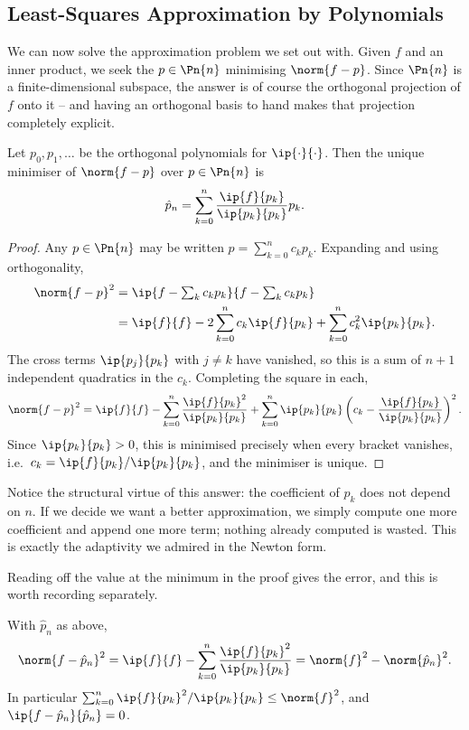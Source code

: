\subsection{Least-Squares Approximation by Polynomials}

We can now solve the approximation problem we set out with. Given $f$ and an inner product, we seek the $p \in \Pn{n}$ minimising $\norm{f - p}$. Since $\Pn{n}$ is a finite-dimensional subspace, the answer is of course the orthogonal projection of $f$ onto it -- and having an orthogonal basis to hand makes that projection completely explicit.

\begin{theorem}\label{thm:lsq}
  Let $p_0, p_1, \dots$ be the orthogonal polynomials for $\ip{\cdot}{\cdot}$. Then the unique minimiser of $\norm{f - p}$ over $p \in \Pn{n}$ is
  $$
  \hat p_n = \sum_{k=0}^{n}\frac{\ip{f}{p_k}}{\ip{p_k}{p_k}}p_k.
  $$
\end{theorem}
\begin{proof}
  Any $p \in \Pn{n}$ may be written $p = \sum_{k=0}^n c_k p_k$. Expanding and using orthogonality,
  \begin{align*}
    \norm{f - p}^2 &= \ip{f - \textstyle\sum_k c_kp_k}{f - \textstyle\sum_k c_kp_k}\\
    &= \ip{f}{f} - 2\sum_{k=0}^n c_k \ip{f}{p_k} + \sum_{k=0}^n c_k^2 \ip{p_k}{p_k}.
  \end{align*}
  The cross terms $\ip{p_j}{p_k}$ with $j \neq k$ have vanished, so this is a sum of $n+1$ independent quadratics in the $c_k$. Completing the square in each,
  $$
  \norm{f-p}^2 = \ip{f}{f} - \sum_{k=0}^n \frac{\ip{f}{p_k}^2}{\ip{p_k}{p_k}} + \sum_{k=0}^n \ip{p_k}{p_k}\left(c_k - \frac{\ip{f}{p_k}}{\ip{p_k}{p_k}}\right)^2 .
  $$
  Since $\ip{p_k}{p_k} > 0$, this is minimised precisely when every bracket vanishes, i.e.\ $c_k = \ip{f}{p_k}/\ip{p_k}{p_k}$, and the minimiser is unique.
\end{proof}

Notice the structural virtue of this answer: the coefficient of $p_k$ does not depend on $n$. If we decide we want a better approximation, we simply compute one more coefficient and append one more term; nothing already computed is wasted. This is exactly the adaptivity we admired in the Newton form.

Reading off the value at the minimum in the proof gives the error, and this is worth recording separately.

\begin{corollary}
  With $\hat p_n$ as above,
  $$
  \norm{f - \hat p_n}^2 = \ip{f}{f} - \sum_{k=0}^n \frac{\ip{f}{p_k}^2}{\ip{p_k}{p_k}} = \norm{f}^2 - \norm{\hat p_n}^2 .
  $$
  In particular $\sum_{k=0}^n \ip{f}{p_k}^2/\ip{p_k}{p_k} \leq \norm{f}^2$, and $\ip{f - \hat p_n}{\hat p_n} = 0$.
\end{corollary}

